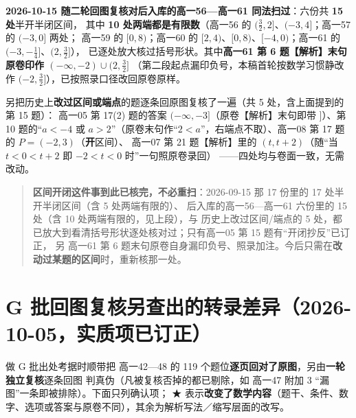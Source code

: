 \documentclass[a4paper,11pt]{article}
\begin{document}
\textbf{2026-10-15 随二轮回图复核对后入库的高一56---高一61 同法扫过}：六份共 \textbf{15 处}半开半闭区间，
其中 \textbf{10 处两端都是有限数}（高一56 的 \((\frac32,2]\)、\((-3,4]\)；高一57 的 \((-3,0]\) 两处；
高一59 的 \([0,8)\)；高一60 的 \([2,4)\)、\([0,8)\)、\([-4,0)\)；高一61 的 \((-3,-\frac14]\)、\((2,\frac32]\)），
已逐处放大核过括号形状。其中\textbf{高一61 第 6 题【解析】末句原卷印作 \((-\infty,-2)\cup(2,\frac32]\)}
（第二段起点漏印负号，本稿首轮按数学习惯静改作 \((-2,\frac32]\)），已按照录口径改回原卷原样。

另把历史上\textbf{改过区间或端点}的题逐条回原图复核了一遍（共 5 处，含上面提到的第 15 题）：
高一05 第 17(2) 题的答案 \((-\infty,-3]\)（原卷【解析】末句即带 \(]\)）、第 10 题的``\(a<-4\) 或
\(a>2\)''（原卷末句作``\(2<a\)''，右端点不取）、高一08 第 17 题的 \(P=(-2,3)\)（\textbf{开}区间）、
高一07 第 21 题【解析】里的 \((t,t+2)\)（随``当 \(t<0<t+2\) 即 \(-2<t<0\) 时''一句照原卷录回）
------四处均与卷面一致，无需改动。

\begin{quote}
\textbf{区间开闭这件事到此已核完，不必重扫}：2026-09-15 那 17 份里的 17 处半开半闭区间（含 5 处两端有限的）、
后入库的高一56---高一61 六份里的 15 处（含 10 处两端有限的，见上段），与
历史上改过区间/端点的 5 处，都已放大到看清括号形状逐处核对过；只有高一05 第 15 题有``开闭抄反''已订正，
另 高一61 第 6 题末句原卷自身漏印负号、照录加注。今后只需在\textbf{改动过某题的区间}时，重新核那一处。
\end{quote}

\clearpage
\section{G 批回图复核另查出的转录差异（2026-10-05，实质项已订正）}

做 G 批出处考据时顺带把 高一42---48 的 119 个题位\textbf{逐页回对了原图}，另由\textbf{一轮独立复核}逐条回图
判真伪（凡被复核否掉的都已剔除，如 高一47 附加 3 ``漏图''一条即被排除）。下面只列确认项；
★ 表示\textbf{改变了数学内容}（题干、条件、数字、选项或答案与原卷不同），其余为解析写法／缩写层面的改写。
\end{document}
